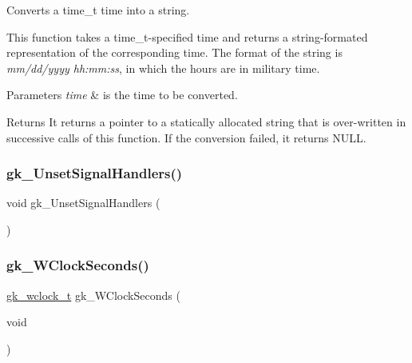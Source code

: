 Converts a time\+\_\+t time into a string. 

This function takes a time\+\_\+t-\/specified time and returns a string-\/formated representation of the corresponding time. The format of the string is {\itshape mm/dd/yyyy hh\+:mm\+:ss}, in which the hours are in military time.


\begin{DoxyParams}{Parameters}
{\em time} & is the time to be converted. \\
\hline
\end{DoxyParams}
\begin{DoxyReturn}{Returns}
It returns a pointer to a statically allocated string that is over-\/written in successive calls of this function. If the conversion failed, it returns N\+U\+LL. 
\end{DoxyReturn}
\mbox{\label{a00077_a972beb4b92a7f6e004291460c4d25d4a}} 
\subsubsection{\texorpdfstring{gk\+\_\+\+Unset\+Signal\+Handlers()}{gk\_UnsetSignalHandlers()}}
{\footnotesize\ttfamily void gk\+\_\+\+Unset\+Signal\+Handlers (\begin{DoxyParamCaption}{ }\end{DoxyParamCaption})}

\mbox{\label{a00077_a26ee28b7655bf889515084c726f41e90}} 
\subsubsection{\texorpdfstring{gk\+\_\+\+W\+Clock\+Seconds()}{gk\_WClockSeconds()}}
{\footnotesize\ttfamily \hyperlink{a00083_a6108a54ce43fb11539dae45074f2ba04}{gk\+\_\+wclock\+\_\+t} gk\+\_\+\+W\+Clock\+Seconds (\begin{DoxyParamCaption}\item[{void}]{ }\end{DoxyParamCaption})}

